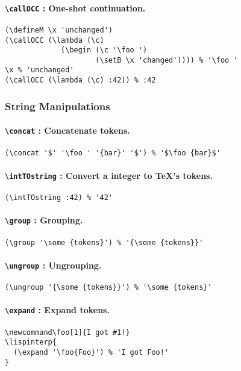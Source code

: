 \documentclass[10pt,a4paper]{article}
\newcommand{\pT}[1]{\textbf{\texttt{\textbackslash #1}}}
\begin{document}
\paragraph{\pT{callOCC} : One-shot continuation.}
\begin{verbatim}
(\defineM \x 'unchanged')
(\callOCC (\lambda (\c)
             (\begin (\c '\foo ')
                     (\setB \x 'changed')))) % '\foo '
\x % 'unchanged'
(\callOCC (\lambda (\c) :42)) % :42
\end{verbatim}


\subsubsection{String Manipulations}

\paragraph{\pT{concat} : Concatenate tokens.}
\begin{verbatim}
(\concat '$' '\foo ' '{bar}' '$') % '$\foo {bar}$'
\end{verbatim}

\paragraph{\pT{intTOstring} : Convert a integer to TeX's tokens.}
\begin{verbatim}
(\intTOstring :42) % '42'
\end{verbatim}

\paragraph{\pT{group} : Grouping.}
\begin{verbatim}
(\group '\some {tokens}') % '{\some {tokens}}'
\end{verbatim}

\paragraph{\pT{ungroup} : Ungrouping.}
\begin{verbatim}
(\ungroup '{\some {tokens}}') % '\some {tokens}' 
\end{verbatim}

\paragraph{\pT{expand} : Expand tokens.}
\begin{verbatim}
\newcommand\foo[1]{I got #1!}
\lispinterp{
  (\expand '\foo{Foo}') % 'I got Foo!'
}
\end{verbatim}
\end{document}
